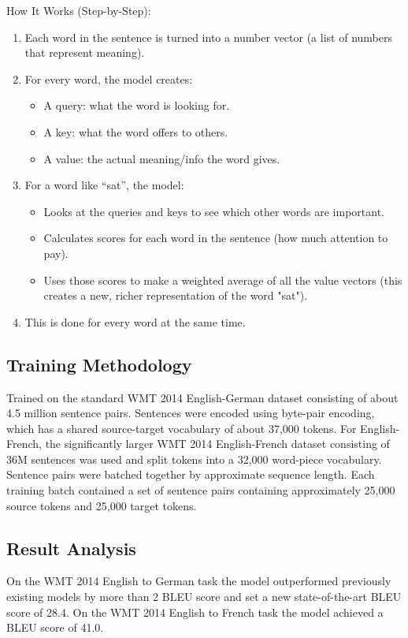\documentclass{article}
\begin{document}
How It Works (Step-by-Step):
\begin{enumerate}
    \item Each word in the sentence is turned into a number vector (a list of numbers that represent meaning).
    \item For every word, the model creates:
    \begin{itemize}
        \item A query: what the word is looking for.
        \item A key: what the word offers to others.
        \item A value: the actual meaning/info the word gives.
    \end{itemize}
    \item For a word like “sat”, the model:
    \begin{itemize}
        \item Looks at the queries and keys to see which other words are important.
        \item Calculates scores for each word in the sentence (how much attention to pay).
        \item Uses those scores to make a weighted average of all the value vectors (this creates a new, richer representation of the word "sat").
    \end{itemize}
    \item This is done for every word at the same time.
\end{enumerate}

\subsection{Training Methodology}
Trained on the standard WMT 2014 English-German dataset consisting of about 4.5 million sentence pairs. Sentences were encoded using byte-pair encoding, which has a shared source-target vocabulary of about 37,000 tokens. For English-French, the significantly larger WMT 2014 English-French dataset consisting of 36M sentences was used and split tokens into a 32,000 word-piece vocabulary. Sentence pairs were batched together by approximate sequence length. Each training batch contained a set of sentence pairs containing approximately 25,000 source tokens and 25,000 target tokens.

\subsection{Result Analysis}
On the WMT 2014 English to German task the model outperformed previously existing models by more than 2 BLEU score and set a new state-of-the-art BLEU score of 28.4.  
On the WMT 2014 English to French task the model achieved a BLEU score of 41.0.
\end{document}
